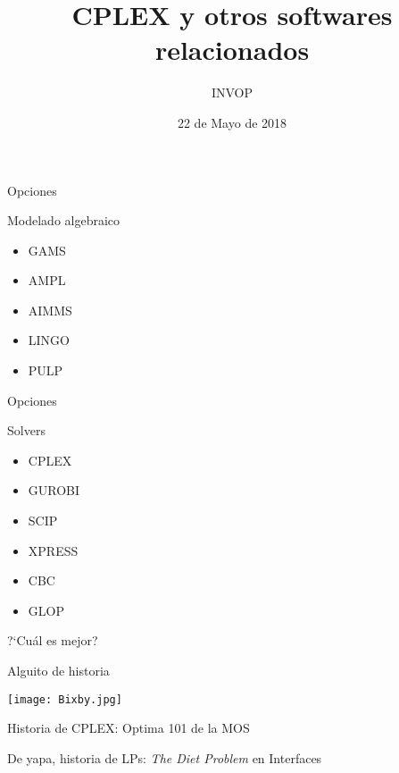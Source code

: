\documentclass{beamer}
\title{CPLEX y otros softwares relacionados}
\author{INVOP}
\institute{Departamento de Computaci\'on, FCEyN, Universidad de Buenos Aires.}
\date{22 de Mayo de 2018}
\begin{document}
\maketitle




\begin{frame}{Opciones}

\begin{block}{Modelado algebraico}
\begin{itemize}
 \item GAMS
 \item AMPL
 \item AIMMS
 \item LINGO
 \item PULP
\end{itemize}

\end{block}

\end{frame}

\begin{frame}{Opciones}

\begin{block}{Solvers}
\begin{itemize}
 \item CPLEX
 \item GUROBI
 \item SCIP
 \item XPRESS
 \item CBC
 \item GLOP
\end{itemize}

\end{block}

?`Cu\'al es mejor?
\end{frame}




\begin{frame}{Alguito de historia}

\begin{center}
\texttt{[image: Bixby.jpg]}
\end{center}
Historia de CPLEX: Optima 101 de la MOS

De yapa, historia de LPs: \emph{The Diet Problem} en Interfaces

\end{frame}
\end{document}
